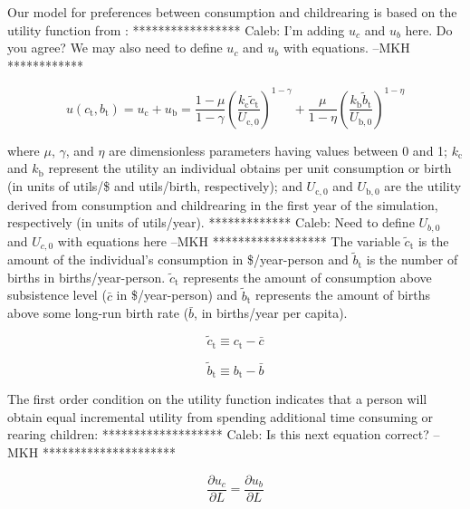 \documentclass[letterpaper,12pt]{article}
\begin{document}
Our model for preferences between consumption and childrearing is based on the utility function from \citet{Jones:2001wn}: ***************** Caleb: I'm adding $u_c$ and $u_b$ here. Do you agree? We may also need to define $u_c$ and $u_b$ with equations.  --MKH ************

\begin{equation} \label{eq:utility_function}
	u(c_\mathrm{t}, b_\mathrm{t}) = u_\mathrm{c} + u_\mathrm{b} = \frac{1-\mu}{1-\gamma} \left(\frac{k_\mathrm{c} \tilde c_\mathrm{t}}{U_\mathrm{c,0}} \right)^{1-\gamma} + \frac{\mu}{1-\eta} \left(\frac{k_\mathrm{b} \tilde b_\mathrm{t}}{U_\mathrm{b,0}} \right)^{1-\eta}
\end{equation}

\noindent where $\mu$, $\gamma$, and $\eta$ are dimensionless parameters having values between 0 and 1; $k_\mathrm{c}$ and $k_\mathrm{b}$ represent the utility an individual obtains per unit consumption or birth (in units of utils/\$ and utils/birth, respectively); and $U_{\mathrm{c,0}}$ and $U_{\mathrm{b,0}}$ are the utility derived from consumption and childrearing in the first year of the simulation, respectively (in units of utils/year). ************* Caleb: Need to define $U_{b,0}$ and $U_{c,0}$ with equations here --MKH ****************** The variable $\tilde c_\mathrm{t}$ is the amount of the individual's consumption in \$/year-person and $\tilde b_\mathrm{t}$ is the number of births in births/year-person. $\tilde c_\mathrm{t}$ represents the amount of consumption above subsistence level ($\bar c$ in \$/year-person) and $\tilde b_\mathrm{t}$ represents the amount of births above some long-run birth rate ($\bar b$, in births/year per capita).

\begin{equation} \label{eq:c_tilde}
	\tilde c_\mathrm{t} \equiv c_\mathrm{t} - \bar c
\end{equation}

\begin{equation} \label{eq:b_tilde}
	\tilde b_\mathrm{t} \equiv b_\mathrm{t} - \bar b
\end{equation}

The first order condition on the utility function indicates that a person will obtain equal incremental utility from spending additional time consuming or rearing children: ******************* Caleb: Is this next equation correct? --MKH *********************

\begin{equation} \label{eq:first_order_condition_def}
	\frac{\partial u_{c}}{\partial L} = \frac{\partial u_{b}}{\partial L}
\end{equation}
\end{document}
